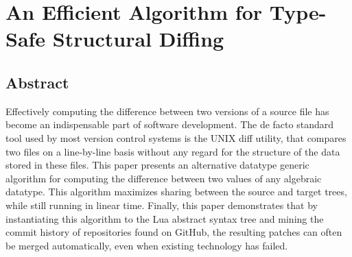 \chapter{An Efficient Algorithm for Type-Safe Structural Diffing}

\section{Abstract}
Effectively computing the difference between two versions of a source file has become an indispensable part of software development. The de facto standard tool used by most version control systems is the UNIX diff utility, that compares two files on a line-by-line basis without any regard for the structure of the data stored in these files. This paper presents an alternative datatype generic algorithm for computing the difference between two values of any algebraic datatype. This algorithm maximizes sharing between the source and target trees, while still running in linear time. Finally, this paper demonstrates that by instantiating this algorithm to the Lua abstract syntax tree and mining the commit history of repositories found on GitHub, the resulting patches can often be merged automatically, even when existing technology has failed.

